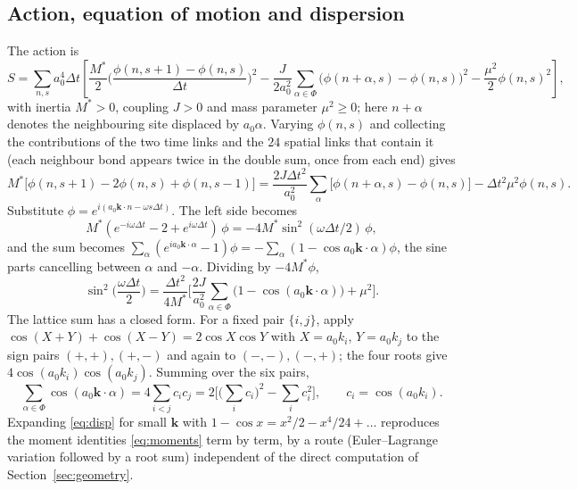 \documentclass[a4paper,11pt]{article}
\numberwithin{equation}{section}
\theoremstyle{jsplain}
\theoremstyle{jsrem}
\begin{document}
\subsection{Action, equation of motion and dispersion}

The action is
\begin{equation}\label{eq:siteaction}
S=\sum_{n,s}a_0^4\Delta t\left[\frac{M^*}{2}\Big(\frac{\phi(n,s{+}1)-\phi(n,s)}{\Delta t}\Big)^2-\frac{J}{2a_0^2}\sum_{\alpha\in\Phi}\big(\phi(n{+}\alpha,s)-\phi(n,s)\big)^2-\frac{\mu^2}{2}\phi(n,s)^2\right],
\end{equation}
with inertia $M^*>0$, coupling $J>0$ and mass parameter $\mu^2\ge0$; here $n+\alpha$ denotes the neighbouring site displaced by $a_0\alpha$. Varying $\phi(n,s)$ and collecting the contributions of the two time links and the $24$ spatial links that contain it (each neighbour bond appears twice in the double sum, once from each end) gives
\begin{equation}\label{eq:eom}
M^*\big[\phi(n,s{+}1)-2\phi(n,s)+\phi(n,s{-}1)\big]=\frac{2J\Delta t^2}{a_0^2}\sum_{\alpha}\big[\phi(n{+}\alpha,s)-\phi(n,s)\big]-\Delta t^2\mu^2\phi(n,s).
\end{equation}
Substitute $\phi=e^{i(a_0\mathbf{k}\cdot n-\omega s\Delta t)}$. The left side becomes
\[
M^*(e^{-i\omega\Delta t}-2+e^{i\omega\Delta t})\,\phi=-4M^*\sin^2(\omega\Delta t/2)\,\phi,
\]
and the sum becomes $\sum_\alpha(e^{ia_0\mathbf{k}\cdot\alpha}-1)\phi=-\sum_\alpha(1-\cos a_0\mathbf{k}\cdot\alpha)\phi$, the sine parts cancelling between $\alpha$ and $-\alpha$. Dividing by $-4M^*\phi$,
\begin{equation}\label{eq:disp}
\sin^2\!\Big(\frac{\omega\Delta t}{2}\Big)=\frac{\Delta t^2}{4M^*}\Big[\frac{2J}{a_0^2}\sum_{\alpha\in\Phi}\big(1-\cos(a_0\mathbf{k}\cdot\alpha)\big)+\mu^2\Big].
\end{equation}
The lattice sum has a closed form. For a fixed pair $\{i,j\}$, apply $\cos(X+Y)+\cos(X-Y)=2\cos X\cos Y$ with $X=a_0k_i$, $Y=a_0k_j$ to the sign pairs $(+,+),(+,-)$ and again to $(-,-),(-,+)$; the four roots give $4\cos(a_0k_i)\cos(a_0k_j)$. Summing over the six pairs,
\begin{equation}\label{eq:cosid}
\sum_{\alpha\in\Phi}\cos(a_0\mathbf{k}\cdot\alpha)=4\sum_{i<j}c_ic_j=2\Big[\Big(\sum_ic_i\Big)^2-\sum_ic_i^2\Big],\qquad c_i=\cos(a_0k_i).
\end{equation}
Expanding \eqref{eq:disp} for small $\mathbf{k}$ with $1-\cos x=x^2/2-x^4/24+\dots$ reproduces the moment identities \eqref{eq:moments} term by term, by a route (Euler--Lagrange variation followed by a root sum) independent of the direct computation of Section~\ref{sec:geometry}.
\end{document}
